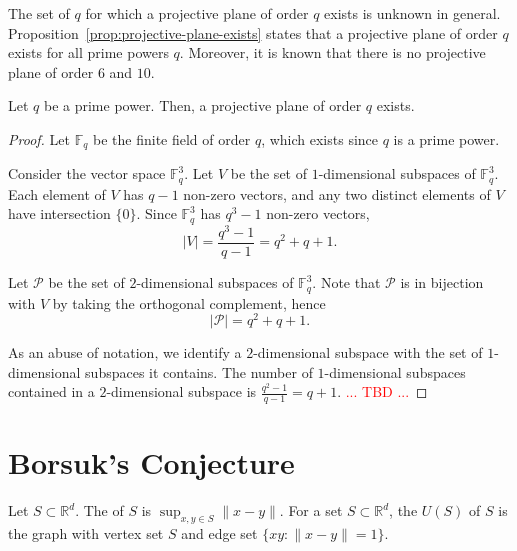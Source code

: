 The set of \(q\) for which a projective plane of order \(q\) exists is unknown in general.
Proposition~\ref{prop:projective-plane-exists} states that a projective plane of order \(q\) exists for all prime powers \(q\).
Moreover, it is known that there is no projective plane of order \(6\) and \(10\).

\begin{proposition} \label{prop:projective-plane-exists}
    Let \(q\) be a prime power.
    Then, a projective plane of order \(q\) exists.
\end{proposition}

\begin{proof}
    Let \(\mathbb{F}_q\) be the finite field of order \(q\),
    which exists since \(q\) is a prime power.

    Consider the vector space \(\mathbb{F}_q^3\).
    Let \(V\) be the set of \(1\)-dimensional subspaces of \(\mathbb{F}_q^3\).
    Each element of \(V\) has \(q-1\) non-zero vectors, and any two distinct elements of \(V\) have intersection \(\{0\}\).
    Since \(\mathbb{F}_q^3\) has \(q^3 - 1\) non-zero vectors,
    \begin{equation}
        |V| = \frac{q^3 - 1}{q-1} = q^2 + q + 1.
    \end{equation}

    Let \(\mathcal{P}\) be the set of \(2\)-dimensional subspaces of \(\mathbb{F}_q^3\).
    Note that \(\mathcal{P}\) is in bijection with \(V\) by taking the orthogonal complement, hence 
    \begin{equation}
        |\mathcal{P}| = q^2 + q + 1.
    \end{equation}

    As an abuse of notation, we identify a \(2\)-dimensional subspace with the set of \(1\)-dimensional subspaces it contains.
    The number of \(1\)-dimensional subspaces contained in a \(2\)-dimensional subspace is \(\frac{q^2 - 1}{q-1} = q+1\).
    \textcolor{red}{... TBD ...}
\end{proof}

\section{Borsuk's Conjecture}

Let \(S \subset \mathbb{R}^d\).
The  of \(S\) is \(\sup_{x, y \in S} \|x - y\|\).
For a set \(S \subset \mathbb{R}^d\),
the  \(U(S)\) of \(S\) is the graph with vertex set \(S\) and edge set \(\{xy : \|x - y\| = 1\}\).

